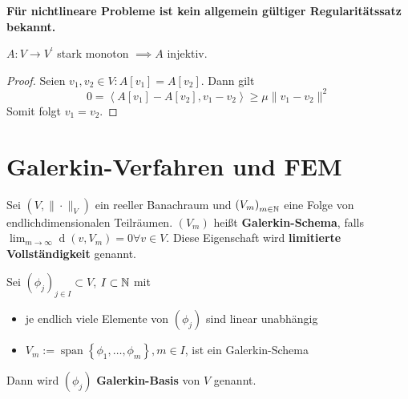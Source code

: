 \textbf{Für nichtlineare Probleme ist kein allgemein gültiger Regularitätssatz bekannt.}

\begin{lemma}[Eindeutigkeit]
	$A\colon V\to V^{\prime}$ stark monoton $\implies A$ injektiv.
\end{lemma}
\begin{proof}
	Seien $v_{1},v_{2}\in V\colon A\left[v_{1}\right] = A\left[v_{2}\right]$. Dann gilt
	\begin{equation*}
		0 = \left<A\left[v_{1}\right]-A\left[v_{2}\right],v_{1}-v_{2}\right> \geq \mu\|v_{1}-v_{2}\|^{2}
	\end{equation*}
	Somit folgt $v_{1}=v_{2}$.
\end{proof}

\section{Galerkin-Verfahren und FEM}
\begin{definition}
	Sei $\left(V,\|\cdot\|_{V}\right)$ ein reeller Banachraum und $\left(V_{m}\right)_{m\in\mathbb{N}}$ eine Folge von endlichdimensionalen Teilräumen. $\left(V_{m}\right)$ heißt \textbf{Galerkin-Schema}, falls $\lim_{m\to\infty} \operatorname{d}\left(v,V_{m}\right) = 0 \forall v\in V$. Diese Eigenschaft wird \textbf{limitierte Vollständigkeit} genannt.
\end{definition}

\begin{definition}
	Sei $\left(\phi_{j}\right)_{j\in I}\subset V$, $I\subset \mathbb{N}$ mit
	\begin{itemize}
		\item je endlich viele Elemente von $\left(\phi_{j}\right)$ sind linear unabhängig
		\item $V_{m} := \operatorname{span}\left\{\phi_{1},\dots,\phi_{m}\right\}, m\in I$, ist ein Galerkin-Schema
	\end{itemize}
	Dann wird $\left(\phi_{j}\right)$ \textbf{Galerkin-Basis} von $V$ genannt.
\end{definition}

